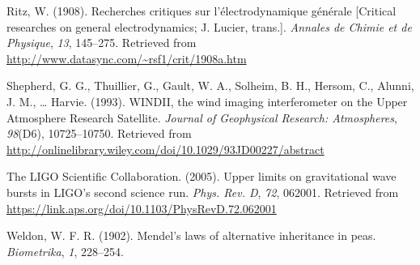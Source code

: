 \documentclass[english,floatsintext,man]{apa6}
\theoremstyle{definition}
\theoremstyle{definition}
\theoremstyle{definition}
\theoremstyle{remark}
\begin{document}
\hypertarget{ref-Ritz:1908}{}
Ritz, W. (1908). Recherches critiques sur l'électrodynamique générale
{[}Critical researches on general electrodynamics; J. Lucier, trans.{]}.
\emph{Annales de Chimie et de Physique}, \emph{13}, 145--275. Retrieved
from \url{http://www.datasync.com/~rsf1/crit/1908a.htm}

\hypertarget{ref-Shepherd:etal:1993}{}
Shepherd, G. G., Thuillier, G., Gault, W. A., Solheim, B. H., Hersom,
C., Alunni, J. M., \ldots{} Harvie. (1993). WINDII, the wind imaging
interferometer on the Upper Atmosphere Research Satellite. \emph{Journal
of Geophysical Research: Atmospheres}, \emph{98}(D6), 10725--10750.
Retrieved from
\url{http://onlinelibrary.wiley.com/doi/10.1029/93JD00227/abstract}

\hypertarget{ref-LIGO:2005}{}
The LIGO Scientific Collaboration. (2005). Upper limits on gravitational
wave bursts in LIGO's second science run. \emph{Phys. Rev. D},
\emph{72}, 062001. Retrieved from
\url{https://link.aps.org/doi/10.1103/PhysRevD.72.062001}

\hypertarget{ref-Weldon:1902}{}
Weldon, W. F. R. (1902). Mendel's laws of alternative inheritance in
peas. \emph{Biometrika}, \emph{1}, 228--254.
\end{document}
